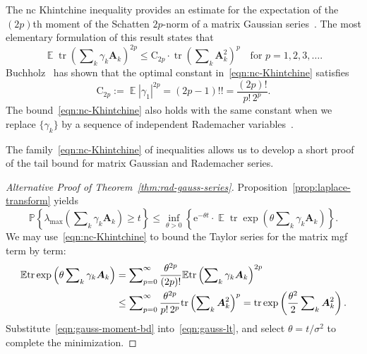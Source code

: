 \documentclass[11pt,letterpaper,twoside,reqno,draft]{amsart}
\theoremstyle{remark}
\numberwithin{equation}{section}
\numberwithin{thm}{section}
\begin{document}
The nc Khintchine inequality provides an estimate for the expectation of the $(2p)$th moment of the Schatten $2p$-norm of a matrix Gaussian series~\cite{L-P86:Inegalites-Khintchine,LPP91:Noncommutative-Khintchine,Pis03:Introduction-Operator}.  The most elementary formulation of this result states that
\begin{equation} \label{eqn:nc-Khintchine}
{\operatorname{\mathbb{E}}} {\operatorname{tr}} \left( \sum\nolimits_k \gamma_k {\bm{{A}}}_k \right)^{2p}
	\leq {\mathrm{{C}}}_{2p} \cdot {\operatorname{tr}} \left( \sum\nolimits_k {\bm{{A}}}_k^2 \right)^p
	\quad\text{for $p = 1, 2, 3, \dots$.}
\end{equation}
Buchholz~\cite[Thm.~5]{Buc01:Operator-Khintchine} has shown that the optimal constant in~\eqref{eqn:nc-Khintchine} satisfies
$$
{\mathrm{{C}}}_{2p} := {\operatorname{\mathbb{E}}} {\left\vert {{\gamma_1}} \right\vert}^{2p}
	= (2p-1)!!
	= \frac{(2p)!}{p! \, 2^p}.
$$
The bound~\eqref{eqn:nc-Khintchine} also holds with the same constant when we replace $\{\gamma_k\}$ by a sequence of independent Rademacher variables~\cite[Thm.~5]{Buc05:Optimal-Constants}.  

The family~\eqref{eqn:nc-Khintchine} of inequalities allows us to develop a short proof of the tail bound for matrix Gaussian and Rademacher series.

\begin{proof}[Alternative Proof of Theorem~\ref{thm:rad-gauss-series}]
Proposition~\ref{prop:laplace-transform} yields
\begin{equation} \label{eqn:gauss-lt}
{\mathbb{P}\left\{ {{ \lambda_{\max}\left( \sum\nolimits_k \gamma_k {\bm{{A}}}_k \right) \geq t }} \right\}}
	\leq \inf_{\theta > 0} \left\{ {\mathrm{e}}^{-\theta t}
	\cdot {\operatorname{\mathbb{E}}} {\operatorname{tr}} \exp\left( \theta \sum\nolimits_k \gamma_k {\bm{{A}}}_k \right) \right\}.
\end{equation}
We may use~\eqref{eqn:nc-Khintchine} to bound the Taylor series for the matrix mgf term by term:
\begin{align} \label{eqn:gauss-moment-bd}
{\operatorname{\mathbb{E}}} {\operatorname{tr}} \exp\left( \theta \sum\nolimits_k \gamma_k {\bm{{A}}}_k \right)	
	&= \sum\nolimits_{p = 0}^\infty \frac{\theta^{2p}}{(2p)!}
		{\operatorname{\mathbb{E}}} {\operatorname{tr}} \left( \sum\nolimits_k \gamma_k {\bm{{A}}}_k \right)^{2p} \notag \\
	&\leq \sum\nolimits_{p = 0}^\infty \frac{\theta^{2p}}{p! \, 2^p}
		{\operatorname{tr}} \left( \sum\nolimits_k {\bm{{A}}}_k^2 \right)^{p}
	= {\operatorname{tr}} \exp\left( \frac{\theta^2}{2} \sum\nolimits_k {\bm{{A}}}_k^2 \right).
\end{align}
Substitute~\eqref{eqn:gauss-moment-bd} into~\eqref{eqn:gauss-lt}, and select $\theta = t/\sigma^2$ to complete the minimization.
\end{proof}
\end{document}
